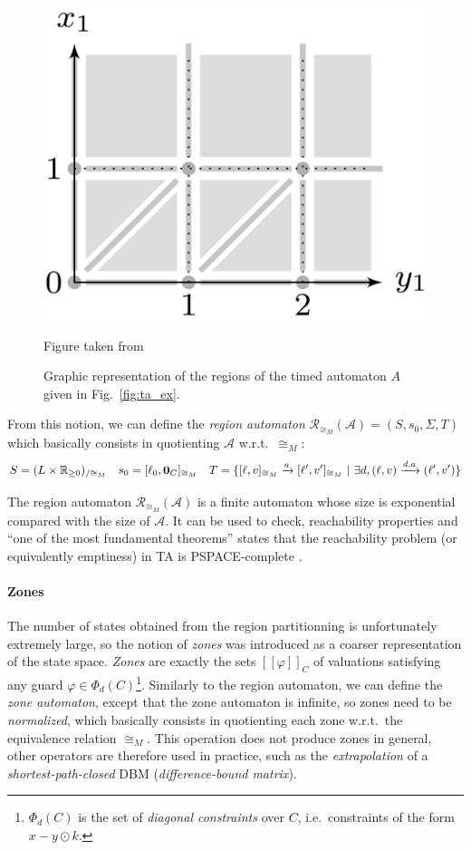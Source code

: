 \documentclass[11pt]{article}
\theoremstyle{definition}
\theoremstyle{remark}
\theoremstyle{definition}
\newtheorem{proposition}{Proposition}
\begin{document}
\begin{figure}[ht]
	\centering
	\includegraphics[width=.25\textwidth]{../img/TAreg.png}
	\caption{Graphic representation of the regions of the timed automaton $A$ given in Fig.~\ref{fig:ta_ex}.}\label{fig:ta_reg}
	\tiny{Figure taken from \cite[Chapter 29.3]{handbook}}	
\end{figure}

From this notion, we can define the \emph{region automaton} $\mathcal{R}_{\cong_M}(\mathcal{A}) = (S, s_0, \Sigma, T)$ which basically consists in quotienting $\mathcal{A}$ w.r.t.\ $\cong_M$:
$$
S = (L \times \mathbb{R}_{\geq 0})_{/\cong_M} \quad
s_0 = [\ell_0, \text{\bf 0}_C]_{\cong_M} \quad
T = \{ [\ell, v]_{\cong_M} \xrightarrow{a} [\ell', v']_{\cong_M}\ | \ \exists d, (\ell, v) \xrightarrow{d, a} (\ell', v')\}
$$


The region automaton $\mathcal{R}_{\cong_M}(\mathcal{A})$ is a finite automaton whose size is exponential compared with the size of $\mathcal{A}$. It can be used to check, reachability properties and ``one of the most fundamental theorems'' \cite[Chapter 29.2, Theorem 1]{handbook} states that the reachability problem (or equivalently emptiness) in TA is PSPACE-complete \cite[Section~4.5]{AlurDill}.

\paragraph{Zones} \label{par:zones}
The number of states obtained from the region partitionning is unfortunately extremely large, so the notion of \emph{zones} was introduced as a coarser representation of the state space. \emph{Zones} are exactly the sets $[\![\varphi]\!]_C$ of valuations satisfying any guard $\varphi \in \Phi_d(C)$\footnote{$\Phi_d(C)$ is the set of \emph{diagonal constraints} over $C$, i.e.\ constraints of the form $x - y \odot k$.}.
Similarly to the region automaton, we can define the \emph{zone automaton}, except that the zone automaton is infinite, so zones need to be \emph{normalized}, which basically consists in quotienting each zone w.r.t.\ the equivalence relation $\cong_M$. This operation does not produce zones in general, other operators are therefore used in practice, such as the \emph{extrapolation} of a \emph{shortest-path-closed} DBM (\emph{difference-bound matrix}).
\end{document}
